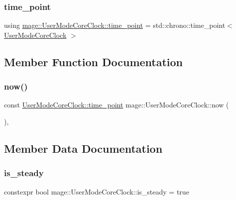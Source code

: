 \hypertarget{structmage_1_1_user_mode_core_clock_a765f0c91417367ed676ffcde829ab365}{}\label{structmage_1_1_user_mode_core_clock_a765f0c91417367ed676ffcde829ab365} 
\subsubsection{\texorpdfstring{time\+\_\+point}{time\_point}}
{\footnotesize\ttfamily using \hyperlink{structmage_1_1_user_mode_core_clock_a765f0c91417367ed676ffcde829ab365}{mage\+::\+User\+Mode\+Core\+Clock\+::time\+\_\+point} =  std\+::chrono\+::time\+\_\+point$<$ \hyperlink{structmage_1_1_user_mode_core_clock}{User\+Mode\+Core\+Clock} $>$}



\subsection{Member Function Documentation}
\hypertarget{structmage_1_1_user_mode_core_clock_a23474e2d92c657b846f13909b97ecdaa}{}\label{structmage_1_1_user_mode_core_clock_a23474e2d92c657b846f13909b97ecdaa} 
\subsubsection{\texorpdfstring{now()}{now()}}
{\footnotesize\ttfamily const \hyperlink{structmage_1_1_user_mode_core_clock_a765f0c91417367ed676ffcde829ab365}{User\+Mode\+Core\+Clock\+::time\+\_\+point} mage\+::\+User\+Mode\+Core\+Clock\+::now (\begin{DoxyParamCaption}{ }\end{DoxyParamCaption})\hspace{0.3cm}{\ttfamily [static]}, {\ttfamily [noexcept]}}



\subsection{Member Data Documentation}
\hypertarget{structmage_1_1_user_mode_core_clock_a041a1090219a8b03a5ac35ff251ef05a}{}\label{structmage_1_1_user_mode_core_clock_a041a1090219a8b03a5ac35ff251ef05a} 
\subsubsection{\texorpdfstring{is\+\_\+steady}{is\_steady}}
{\footnotesize\ttfamily constexpr bool mage\+::\+User\+Mode\+Core\+Clock\+::is\+\_\+steady = true\hspace{0.3cm}{\ttfamily [static]}}

